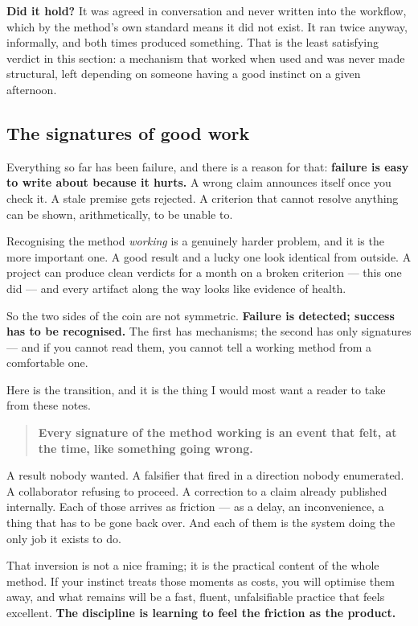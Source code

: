 \textbf{Did it hold?} It was agreed in conversation and never written into the workflow, which by the method's own standard means it did not exist. It ran twice anyway, informally, and both times produced something. That is the least satisfying verdict in this section: a mechanism that worked when used and was never made structural, left depending on someone having a good instinct on a given afternoon.

\subsection{The signatures of good work}

Everything so far has been failure, and there is a reason for that: \textbf{failure is easy to write about because it hurts.} A wrong claim announces itself once you check it. A stale premise gets rejected. A criterion that cannot resolve anything can be shown, arithmetically, to be unable to.

Recognising the method \textit{working} is a genuinely harder problem, and it is the more important one. A good result and a lucky one look identical from outside. A project can produce clean verdicts for a month on a broken criterion --- this one did --- and every artifact along the way looks like evidence of health.

So the two sides of the coin are not symmetric. \textbf{Failure is detected; success has to be recognised.} The first has mechanisms; the second has only signatures --- and if you cannot read them, you cannot tell a working method from a comfortable one.

Here is the transition, and it is the thing I would most want a reader to take from these notes.

\begin{quote}
\textbf{Every signature of the method working is an event that felt, at the time, like something going wrong.}
\end{quote}

A result nobody wanted. A falsifier that fired in a direction nobody enumerated. A collaborator refusing to proceed. A correction to a claim already published internally. Each of those arrives as friction --- as a delay, an inconvenience, a thing that has to be gone back over. And each of them is the system doing the only job it exists to do.

That inversion is not a nice framing; it is the practical content of the whole method. If your instinct treats those moments as costs, you will optimise them away, and what remains will be a fast, fluent, unfalsifiable practice that feels excellent. \textbf{The discipline is learning to feel the friction as the product.}

